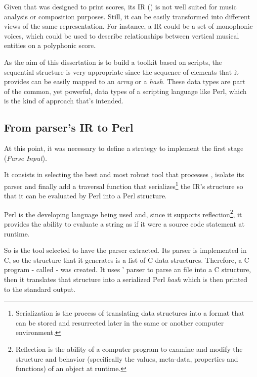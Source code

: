 Given that \abcmtops{} was designed to print \abc{} scores, its \ac{IR} (\sourcewise{}) is not well suited
for music analysis or composition purposes. Still, it can be easily transformed into different views
of the same representation. For instance, a \timewise{} \ac{IR} could be a set of monophonic voices,
which could be used to describe relationships between vertical musical entities on a polyphonic
score.

As the aim of this dissertation is to build a toolkit based on scripts, the sequential structure is
very appropriate since the sequence of elements that it provides can be easily mapped to an
\emph{array} or a \emph{hash}. These data types are part of the common, yet powerful, data types of
a scripting language like Perl, which is the kind of approach that's intended.

\subsection{From \abcmtops{} parser's IR to Perl}

At this point, it was necessary to define a strategy to implement the first stage (\emph{Parse
\abc{} Input}).

It consists in selecting the best and most robust tool that processes \abc{}, isolate its parser and
finally add a traversal function that serializes\footnote{Serialization is the process of
translating data structures into a format that can be stored and resurrected later in the same or
another computer environment.} the \ac{IR}'s structure so that it can be evaluated by Perl into a Perl
structure.

Perl is the developing language being used and, since it supports reflection\footnote{Reflection is
the ability of a computer program to examine and modify the structure and behavior (specifically the
values, meta-data, properties and functions) of an object at runtime.}, it provides the ability to
evaluate a string as if it were a source code statement at runtime.

So \abcmtops{} is the tool selected to have the parser extracted. Its parser is implemented in C, so
the structure that it generates is a list of C data structures. Therefore, a C program - called
\abctoperl{} - was created. It uses \abcmtops{}' parser to parse an \abc{} file into a C structure,
then it translates that structure into a serialized Perl \emph{hash} which is then printed to the
standard output.

